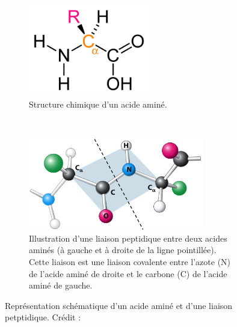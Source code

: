 	\begin{figure}[htb]
		\begin{subfigure}{.4\textwidth}
			\centering
			\includegraphics[height=4cm]{./figures/ch1/amino_acid_structure}
			\caption{Structure chimique d'un acide aminé.}
			\label{fig:amino_acid_structure}
		\end{subfigure}
		~
		\begin{subfigure}{.6\textwidth}
			\centering
			\includegraphics[height=4cm]{./figures/ch1/peptidic_bond.png}
			\caption{Illustration d'une liaison peptidique entre deux acides aminés (à gauche et à droite de la ligne pointillée). Cette liaison est une liaison covalente entre l'azote (N) de l'acide aminé de droite et le carbone (C) de l'acide aminé de gauche.}
			\label{fig:peptide_bond}
		\end{subfigure}
		\caption[Acide aminé]{Représentation schématique d'un acide aminé et d'une liaison petptidique. Crédit :~\cite{berg_biochemistry_2012}}
		\label{fig:aminoAcid}
	\end{figure}
	
